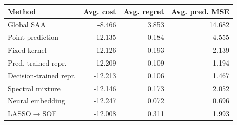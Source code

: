 \begin{tabular}{lrrr}
\toprule
Method & Avg. cost & Avg. regret & Avg. pred. MSE \\
\midrule
Global SAA & -8.466 & 3.853 & 14.682 \\
Point prediction & -12.135 & 0.184 & 4.555 \\
Fixed kernel & -12.126 & 0.193 & 2.139 \\
Pred.-trained repr. & -12.209 & 0.109 & 1.194 \\
Decision-trained repr. & -12.213 & 0.106 & 1.467 \\
Spectral mixture & -12.146 & 0.173 & 2.052 \\
Neural embedding & -12.247 & 0.072 & 0.696 \\
LASSO$\to$SOF & -12.008 & 0.311 & 1.993 \\
\bottomrule
\end{tabular}
